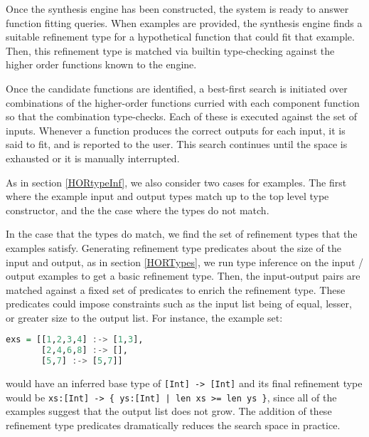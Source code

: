 Once the synthesis engine has been constructed, the system is ready to answer function fitting queries. When examples are provided, the synthesis engine finds a suitable refinement type for a hypothetical function that could fit that example. Then, this refinement type is matched via builtin type-checking against the higher order functions known to the engine.

Once the candidate functions are identified, a best-first search is initiated over combinations of the higher-order functions curried with each component function so that the combination type-checks. Each of these is executed against the set of inputs. Whenever a function produces the correct outputs for each input, it is said to fit, and is reported to the user. This search continues until the space is exhausted or it is manually interrupted.

As in section \ref{HORtypeInf}, we also consider two cases for examples. The first where the example input and output types match up to the top level type constructor, and the the case where the types do not match.

In the case that the types do match, we find the set of refinement types that the examples satisfy. Generating refinement type predicates about the size of the input and output, as in section \ref{HORTypes}, we run type inference on the input / output examples to  get a basic refinement type. Then, the input-output pairs are matched against a fixed set of predicates to enrich the refinement type. These predicates could impose constraints such as the input list being of equal, lesser, or greater size to the output list.  For instance, the example set:
\begin{lstlisting}[language=haskell]
exs = [[1,2,3,4] :-> [1,3],
       [2,4,6,8] :-> [],
       [5,7] :-> [5,7]]
\end{lstlisting}
\noindent would have an inferred base type  of \texttt{[Int] -> [Int]} and its final refinement type would be \texttt{xs:[Int] -> \{ ys:[Int] | len xs >= len ys \}}, since all of the examples suggest that the output list does not grow. The addition of these refinement type predicates dramatically reduces the search space in practice.


